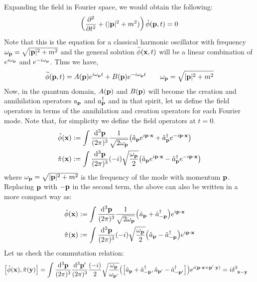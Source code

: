 Expanding the field in Fourier space, we would obtain the following:
$$\left(\pdv[2]{t} + (|\vb{{p}}|^2+m^2)\right)\tilde{\phi}(\vb{{p}},t)=0$$
Note that this is the equation for a classical harmonic oscillator with frequency $\omega_{\vb{{p}}} = \sqrt{|\vb{{p}}|^2+m^2}$ and the general solution $\widetilde{\phi}(\vb{{x}},t)$ will be a linear combination of 
$e^{i\omega_{\vb{{p}}}}$ and $e^{-i\omega_{\vb{{p}}}}$. Thus we have,
$$\widetilde{\phi}(\vb{{p}},t) = A(\vb{{p}}) e^{i\omega_{\vb{{p}}}t} + B(\vb{{p}})e^{-i\omega_{\vb{{p}}}t} \qquad \omega_{\vb{{p}}} = \sqrt{|\vb{{p}}|^2 + m^2}$$
Now, in the quantum domain, $A(\vb{{p}})$ and $B(\vb{{p}})$ will become the creation and annihilation operators $a_{\vb{{p}}}$ and $a_{\vb{{p}}}^\dagger$ and in that spirit, let us define the field operators in terms of the annihilation and creation operators for each Fourier mode. Note that, for simplicity we define the field operators at $t=0$. 
\begin{align*}
    \hat{\phi}(\vb{{x}})&:= \int \frac{\dd^3\vb{{p}}}{(2\pi)^3}\frac{1}{\sqrt{2\omega_{\vb{{p}}}}}\qty(\hat{a}_{\vb{{p}}} e^{i \vb{{p}}\cdot \vb{{x}}} + \hat{a}_{\vb{{p}}}^\dagger e^{-i \vb{{p}}\cdot \vb{{x}}})\\
    \hat{\pi}(\vb{{x}})&:= \int \frac{\dd^3\vb{{p}}}{(2\pi)^3}(-i)\sqrt{\frac{\omega_{\vb{{p}}}}{2}}\qty(\hat{a}_{\vb{{p}}} e^{i \vb{{p}}\cdot \vb{{x}}} - \hat{a}_{\vb{{p}}}^\dagger e^{-i \vb{{p}}\cdot \vb{{x}}})
\end{align*}
where $\omega_{\vb{{p}}} = \sqrt{|{\vb{{p}}}|^2+m^2}$ is the frequency of the mode with momentum $\vb{{p}}$. Replacing $\vb{{p}}$ with $-\vb{{p}}$ in the second term, the above can also be written in a more compact way as:
\begin{align*}
    \hat{\phi}(\vb{{x}})&:= \int \frac{\dd^3\vb{{p}}}{(2\pi)^3}\frac{1}{\sqrt{2\omega_{\vb{{p}}}}}\qty(\hat{a}_{\vb{{p}}}+ \hat{a}_{-\vb{{p}}}^\dagger)e^{i \vb{{p}}\cdot \vb{{x}}}\\
    \hat{\pi}(\vb{{x}})&:= \int \frac{\dd^3\vb{{p}}}{(2\pi)^3}(-i)\sqrt{\frac{\omega_{\vb{{p}}}}{2}}\qty(\hat{a}_{\vb{{p}}} -\hat{a}_{-\vb{{p}}}^\dagger )e^{i \vb{{p}}\cdot \vb{{x}}}
\end{align*}
Let us check the commutation relation:
\begin{align*}
    \comtr{\hat{\phi}(\tvec{x})}{\hat{\pi}(\tvec{y})}&=\int\meas{\tvec{p}}\meas{\tvec{p}'}\frac{(-i)}{2}\sqrt{\frac{\omp}{\ompd}}\qty(\comtr{\hat{a}_{\tvec{p}}+ \hat{a}_{-\tvec{p}}^\dagger}{\hat{a}_{\tvec{p}'} -\hat{a}_{-\tvec{p}'}^\dagger})e^{i(\vb{p}\cdot \vb{x} + \vb{p}'\cdot \vb{y})} = i\delt{3}{\tvec{x}-\vb{y}}
\end{align*}
